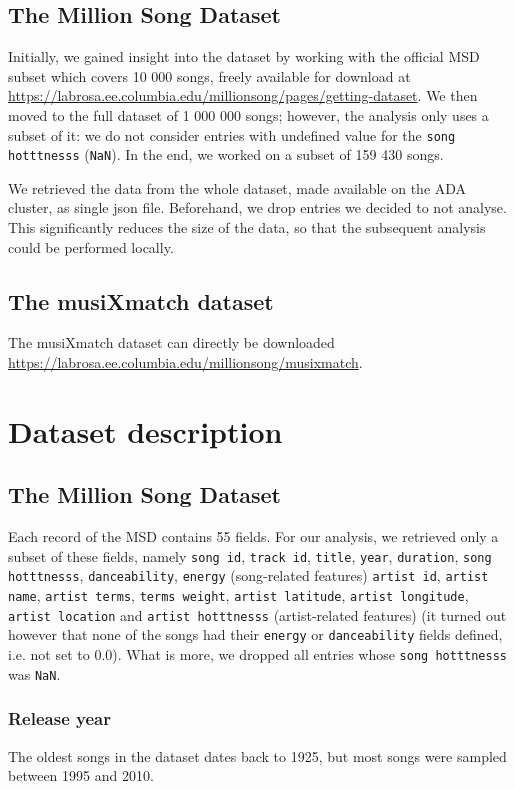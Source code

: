 \documentclass[11pt]{article}
\renewcommand\_{\textunderscore\allowbreak}
\begin{document}
\subsection{The Million Song Dataset}
Initially, we gained insight into the dataset by working with the official MSD subset which covers 10 000 songs, freely available for download at \url{https://labrosa.ee.columbia.edu/millionsong/pages/getting-dataset}.
We then moved to the full dataset of 1 000 000 songs; however, the analysis only uses a subset of it: we do not consider entries with undefined value for the \texttt{song hotttnesss} (\texttt{NaN}).
In the end, we worked on a subset of 159 430 songs.

We retrieved the data from the whole dataset, made available on the ADA cluster, as single json file. Beforehand, we drop entries we decided to not analyse. 
This significantly reduces the size of the data, so that the subsequent analysis could be performed locally.

\subsection{The musiXmatch dataset}
The musiXmatch dataset can directly be downloaded  \url{https://labrosa.ee.columbia.edu/millionsong/musixmatch}.

\section{Dataset description}
\subsection{The Million Song Dataset}
Each record of the MSD contains 55 fields.
For our analysis, we retrieved only a subset of these fields, namely \texttt{song id}, \texttt{track id}, \texttt{title}, \texttt{year}, \texttt{duration}, \texttt{song hotttnesss}, \texttt{danceability}, \texttt{energy} (song-related features) \texttt{artist id}, \texttt{artist name}, \texttt{artist terms}, \texttt{terms weight}, \texttt{artist latitude},  \texttt{artist longitude}, \texttt{artist location} and \texttt{artist hotttnesss} (artist-related features) 
(it turned out however that none of the songs had their \texttt{energy} or \texttt{danceability} fields defined, i.e. not set to 0.0).
What is more, we dropped all entries whose \texttt{song hotttnesss} was \texttt{NaN}.

\subsubsection{Release year}
The oldest songs in the dataset dates back to 1925, but most songs were sampled between 1995 and 2010.
\end{document}
